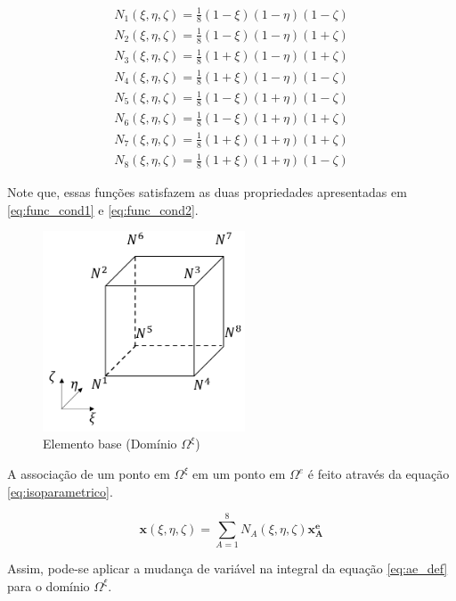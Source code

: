 \begin{equation}
\begin{matrix}\label{eq:func_base}
N_1(\xi, \eta, \zeta) = \frac{1}{8} (1-\xi)(1-\eta)(1-\zeta) \\
N_2(\xi, \eta, \zeta) = \frac{1}{8} (1-\xi)(1-\eta)(1+\zeta) \\
N_3(\xi, \eta, \zeta) = \frac{1}{8} (1+\xi)(1-\eta)(1+\zeta) \\
N_4(\xi, \eta, \zeta) = \frac{1}{8} (1+\xi)(1-\eta)(1-\zeta) \\
N_5(\xi, \eta, \zeta) = \frac{1}{8} (1-\xi)(1+\eta)(1-\zeta) \\
N_6(\xi, \eta, \zeta) = \frac{1}{8} (1-\xi)(1+\eta)(1+\zeta) \\
N_7(\xi, \eta, \zeta) = \frac{1}{8} (1+\xi)(1+\eta)(1+\zeta) \\
N_8(\xi, \eta, \zeta) = \frac{1}{8} (1+\xi)(1+\eta)(1-\zeta)
\end{matrix}
\end{equation}

Note que, essas funções satisfazem as duas propriedades apresentadas em \ref{eq:func_cond1} e \ref{eq:func_cond2}.


\begin{figure}[!htbp]
\label{fig:elemento_base}
\centering
\includegraphics[width=6cm]{chap01/elemento_base.png}
\caption{Elemento base (Domínio $\Omega^\xi$)}
\end{figure}



A associação de um ponto em $\Omega^\xi$ em um ponto em $\Omega^e$ é feito através da equação \ref{eq:isoparametrico}.


\begin{equation}
\label{eq:isoparametrico}
\mathbf{x}(\xi, \eta, \zeta) = \sum_{A=1}^{8} N_A(\xi, \eta, \zeta) \mathbf{x^e_A}
\end{equation}

Assim, pode-se aplicar a mudança de variável na integral da equação \ref{eq:ae_def} para o domínio $\Omega^\xi$.

